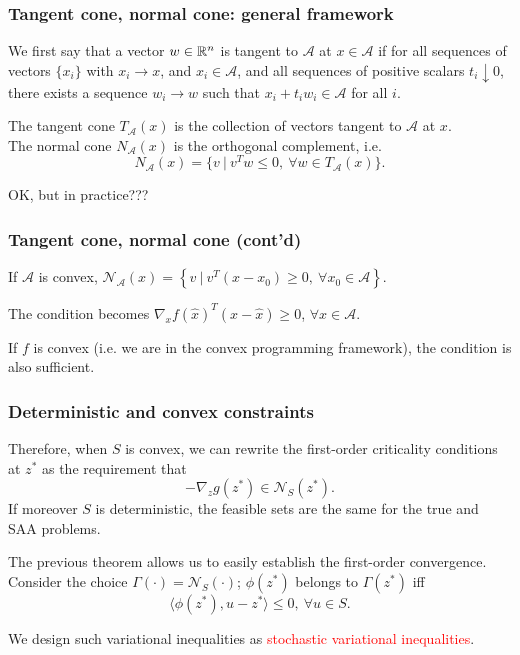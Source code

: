 \documentclass{beamer}
\begin{document}
\begin{frame}
\frametitle{Tangent cone, normal cone: general framework}

We first say that a vector $w \in \mathbb{R}^n$ is tangent to $\mathcal{A}$ at $x \in \mathcal{A}$ if for all sequences of vectors $\lbrace x_i \rbrace$ with $x_i \rightarrow x$, and $x_i \in \mathcal{A}$, and all sequences of positive scalars $t_i \downarrow 0$, there exists a sequence $w_i \rightarrow w$ such that $x_i + t_iw_i \in \mathcal{A}$ for all $i$.

\mbox{}

The {\red tangent cone $T_{\mathcal{A}}(x)$} is the collection of vectors tangent to ${\mathcal{A}}$ at $x$. \\
The {\red normal cone $N_{\mathcal{A}}(x)$} is the orthogonal complement, i.e.
\[
N_{\mathcal{A}}(x) = \lbrace v\ |\ v^Tw \leq 0,\ \forall w \in T_{\mathcal{A}}(x) \rbrace.
\]

\mbox{}

OK, but in practice???

\end{frame}

\begin{frame}
\frametitle{Tangent cone, normal cone (cont'd)}

If ${\mathcal{A}}$ is convex,
$
\mathcal{N}_{\mathcal{A}}(x) = \left\lbrace v\ |\ v^T(x-x_0) \geq 0,\ \forall x_0 \in
{\mathcal{A}} \right\rbrace.
$

\mbox{}

The condition becomes
$\nabla_x f(\hat{x})^T (x-\hat{x}) \geq 0$, $\forall x \in {\mathcal{A}}$.

\mbox{}

If $f$ is convex (i.e. we are in the convex programming framework), the condition is also sufficient.

\end{frame}

\begin{frame}
\frametitle{Deterministic and convex constraints}

Therefore, when $S$ is convex, we can rewrite the first-order criticality conditions at $z^*$ as the requirement that 
$$
-\nabla_z g(z^*) \in \mathcal{N}_{S}(z^*).
$$
If moreover $S$ is deterministic, the feasible sets are the same for the true and SAA problems.

\mbox{}

The previous theorem allows us to easily establish the first-order convergence.
Consider the choice $\Gamma(\cdot) = \mathcal{N}_S(\cdot)$; $\phi(z^*)$ belongs to $\Gamma(z^*)$ iff
\[
\langle \phi(z^*), u-z^*\rangle \leq 0,\ \forall u \in S.
\]

We design such variational inequalities as \textcolor{red}{stochastic variational inequalities}.

\end{frame}
\end{document}
